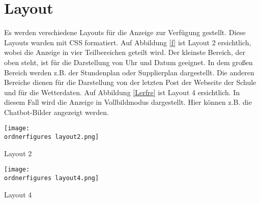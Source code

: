 \section{Layout}
Es werden verschiedene Layouts f\"ur die Anzeige zur Verf\"ugung gestellt. Diese Layouts wurden mit CSS formatiert. Auf Abbildung \ref{f} ist Layout 2 ersichtlich, wobei die Anzeige in vier Teilbereichen geteilt wird. Der kleinste Bereich, der oben steht, ist f\"ur die Darstellung von Uhr und Datum geeignet. In dem gro\ss{}en Bereich werden z.B. der Stundenplan oder Supplierplan dargestellt. Die anderen Bereiche dienen f\"ur die Darstellung von der letzten Post der Webseite der Schule und f\"ur die Wetterdaten.
Auf Abbildung \ref{Lerfre} ist Layout 4 ersichtlich. In diesem Fall wird die Anzeige in Vollbildmodus dargestellt. Hier k\"onnen z.B. die Chatbot-Bilder angezeigt werden.
\begin{center}
	\captionsetup{type=figure}
	\texttt{[image: \\ordnerfigures layout2.png]}
	\caption{Layout 2}
	\label{f} 
\end{center}
\begin{center}
	\captionsetup{type=figure}
	\texttt{[image: \\ordnerfigures layout4.png]}
	\caption{Layout 4}
	\label{Lerfre} 
\end{center}
